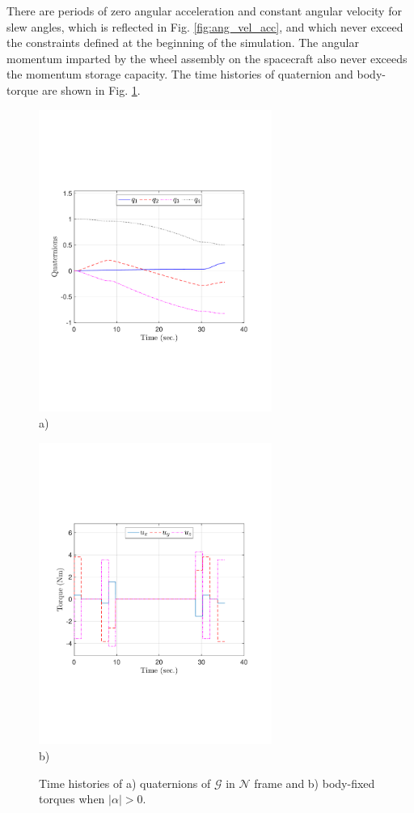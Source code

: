 \documentclass[journal ]{new-aiaa}
\begin{document}
There are periods of zero angular acceleration and constant angular velocity for slew angles, which is reflected in Fig. \ref{fig:ang_vel_acc}, and which never exceed the constraints defined at the beginning of the simulation. The angular momentum imparted by the wheel assembly on the spacecraft also never exceeds the momentum storage capacity. The time histories of quaternion and body-torque are shown in Fig. \ref{fig:quats_phi_total}.

\begin{figure}[htb!]
    \centering
    \begin{minipage}{.5\textwidth}
        \centering
\includegraphics[width=3in]{total_quaternions.pdf}
		\\ a) 
        \label{fig:prob1_6_2}
    \end{minipage}%
    \begin{minipage}{0.5\textwidth}
        \centering
   \includegraphics[width=3in]{total_torque.pdf}
        \label{fig:prob1_6_1}
        \\ b) 
    \end{minipage}
    \caption{Time histories of a) quaternions of $\mathcal{G}$ in $\mathcal{N}$ frame and b) body-fixed torques when $|\alpha|>0$.}
    \label{fig:quats_phi_total}
	\end{figure}
\end{document}
